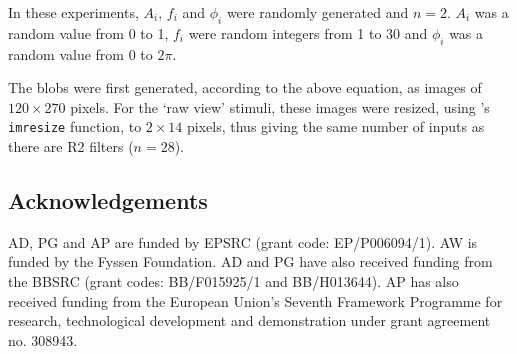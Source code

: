 In these experiments, $A_i$, $f_i$ and $\phi_i$ were randomly generated and $n=2$.
$A_i$ was a random value from 0 to 1, $f_i$ were random integers from 1 to 30 and $\phi_i$ was a random value from 0 to $2\pi$.
\begin{comment}
nvar = 1000;
nwave = 2;
maxfreq = 30;
maxamp = 1;
\end{comment}

The blobs were first generated, according to the above equation, as images of $120\times 270$ pixels.
For the `raw view' stimuli, these images were resized, using \Matlab's \texttt{imresize} function, to $2\times 14$ pixels, thus giving the same number of inputs as there are R2 filters ($n=28$).

\begin{comment}
\subsubsection*{Grading performance of neural networks}
The performance of neural networks was graded by calculating the \ac{rms} difference between the matrix of true values for the parameters with the network's output:
$$
E(\mathbf{y},\mathbf{t}) = \sqrt{\frac{\sum\limits_{i=1}^{n} (\mathbf{y}_i-\mathbf{t}_i)^2}{n}}
$$
where $E(\mathbf{y},\mathbf{t})$ is the mean error score, computed from the vector of outputs given by the network, $\mathbf{y}$, and the vector of true values, $\mathbf{t}$.
Hence, for a network that computed the values of all parameters accurately, a graph of the network's output \emph{vs.} the true values would give the line $y=x$ and an error score of 0 over the whole range of values.
\end{comment}

\subsection*{Acknowledgements}
AD, PG and AP are funded by EPSRC (grant code: EP/P006094/1).
AW is funded by the Fyssen Foundation.
AD and PG have also received funding from the BBSRC (grant codes: BB/F015925/1 and BB/H013644).
AP has also received funding from the European Union’s Seventh Framework Programme for research, technological development and demonstration under grant agreement no. 308943.

